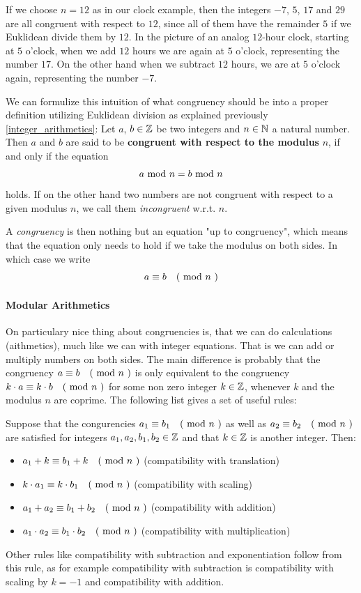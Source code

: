 \begin{example}
If we choose $n=12$ as in our clock example, then the integers $-7$, $5$, $17$ and $29$ are all congruent with respect to $12$, since all of them have the remainder $5$ if we Euklidean divide them by $12$. In the picture of an analog $12$-hour clock, starting at $5$ o'clock, when we add $12$ hours we are again at $5$ o'clock, representing the number $17$. On the other hand when we subtract $12$ hours, we are at $5$ o'clock again, representing the number $-7$. 
\end{example}
We can formulize this intuition of what congruency should be into a proper definition utilizing Euklidean division as explained previously \ref{integer_arithmetics}: Let $ a $, $ b \in \mathbb{Z} $ be two integers and $ n \in \mathbb{N} $ a natural number.
Then $ a $ and $ b $ are said to be \textbf{congruent with respect to the modulus} $ n $, if and only if the equation
\begin{equation}
a \text{ mod } n = b \text{ mod } n
\end{equation}
holds. If on the other hand two numbers are not congruent with respect to a given modulus $n$, we call them \textit{incongruent} w.r.t. $n$. 

A \textit{congruency} is then nothing but an equation "up to congruency", which means that the equation only needs to hold if we take the modulus on both sides. In which case we write 
\begin{equation}
a \equiv b \quad \text{( mod } n \text{ )} 
\end{equation}
\paragraph{Modular Arithmetics}
On particulary nice thing about congruencies is, that we can do calculations (aithmetics), much like we can with integer equations. That is we can add or multiply numbers on both sides. The main difference is probably that the congruency $a \equiv b \quad \text{( mod } n \text{ )}$ is only equivalent to the congruency $k\cdot a \equiv k\cdot b \quad \text{( mod } n \text{ )}$ for some non zero integer $k\in \mathbb{Z}$, whenever $k$ and the modulus $n$ are coprime. The following list gives a set of useful rules:

Suppose that the congurencies $a_1 \equiv b_1 \quad \text{( mod } n \text{ )}$ as well as $a_2 \equiv b_2 \quad \text{( mod } n \text{ )}$ are satisfied for integers $a_1,a_2,b_1,b_2\in\mathbb{Z}$ and that $k\in\mathbb{Z}$ is another integer. Then:
\begin{itemize}
\item $a_1+k \equiv b_1+k \quad \text{( mod } n \text{ )}$ (compatibility with translation)
\item $k\cdot a_1 \equiv k\cdot b_1 \quad \text{( mod } n \text{ )}$ (compatibility with scaling)
\item $a_1+a_2 \equiv b_1+b_2 \quad \text{( mod } n \text{ )}$ (compatibility with addition)
\item $a_1\cdot a_2 \equiv b_1\cdot b_2 \quad \text{( mod } n \text{ )}$ (compatibility with multiplication)
\end{itemize}
Other rules like compatibility with subtraction and exponentiation follow from this rule, as for example compatibility with subtraction is compatibility with scaling by $k=-1$ and compatibility with addition.

